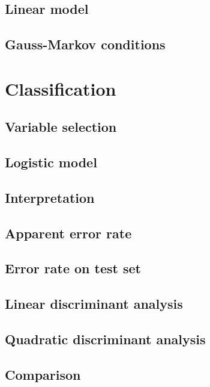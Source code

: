 \documentclass[a4paper, 12pt]{article}
\begin{document}
\subsection*{Linear model}
\subsection*{Gauss-Markov conditions}

\section{Classification}
\subsection*{Variable selection}
\subsection*{Logistic model}
\subsection*{Interpretation}
\subsection*{Apparent error rate}
\subsection*{Error rate on test set}
\subsection*{Linear discriminant analysis}
\subsection*{Quadratic discriminant analysis}
\subsection*{Comparison}

\end{document}
